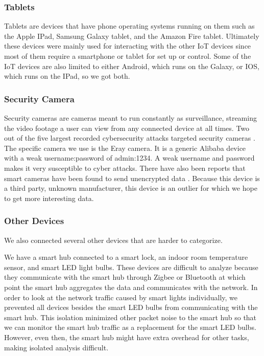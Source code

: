 \subsubsection{Tablets}

Tablets are devices that have phone operating systems running on them such as the Apple IPad, Samsung Galaxy tablet, and the Amazon Fire tablet. Ultimately these devices were mainly used for interacting with the other IoT devices since most of them require a smartphone or tablet for set up or control. Some of the IoT devices are also limited to either Android, which runs on the Galaxy, or IOS, which runs on the IPad, so we got both.

\subsubsection{Security Camera}

Security cameras are cameras meant to run constantly as surveillance, streaming the video footage a user can view from any connected device at all times. Two out of the five largest recorded cybersecurity attacks targeted security cameras \cite{guest_2018}. The specific camera we use is the Eray camera. It is a generic Alibaba device with a weak username:password of admin:1234. A weak username and password makes it very susceptible to cyber attacks. There have also been reports that smart cameras have been found to send unencrypted data \cite{feamster_2016}. Because this device is a third party, unknown manufacturer, this device is an outlier for which we hope to get more interesting data.

\subsubsection{Other Devices}

We also connected several other devices that are harder to categorize.

We have a smart hub connected to a smart lock, an indoor room temperature sensor, and smart LED light bulbs. These devices are difficult to analyze because they communicate with the smart hub through Zigbee or Bluetooth at which point the smart hub aggregates the data and communicates with the network. In order to look at the network traffic caused by smart lights individually, we prevented all devices besides the smart LED bulbs from communicating with the smart hub. This isolation minimized other packet noise to the smart hub so that we can monitor the smart hub traffic as a replacement for the smart LED bulbs. However, even then, the smart hub might have extra overhead for other tasks, making isolated analysis difficult.


